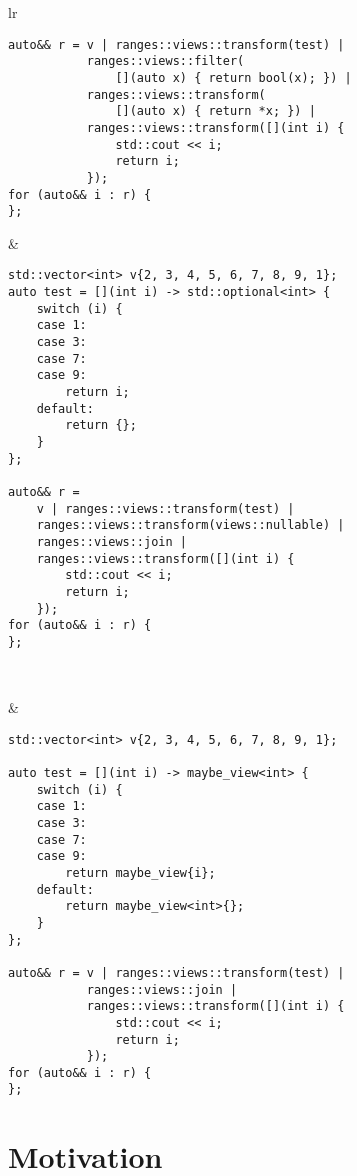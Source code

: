 \documentclass[a4paper,10pt,oneside,openany,final,article]{memoir}
\begin{document}
\begin{tabular}{ lr }
\begin{minipage}[t]{0.45\columnwidth}
\begin{verbatim}
auto&& r = v | ranges::views::transform(test) |
           ranges::views::filter(
               [](auto x) { return bool(x); }) |
           ranges::views::transform(
               [](auto x) { return *x; }) |
           ranges::views::transform([](int i) {
               std::cout << i;
               return i;
           });
for (auto&& i : r) {
};

\end{verbatim}
\end{minipage}
&
\begin{minipage}[t]{0.45\columnwidth}
\begin{verbatim}
std::vector<int> v{2, 3, 4, 5, 6, 7, 8, 9, 1};
auto test = [](int i) -> std::optional<int> {
    switch (i) {
    case 1:
    case 3:
    case 7:
    case 9:
        return i;
    default:
        return {};
    }
};

auto&& r =
    v | ranges::views::transform(test) |
    ranges::views::transform(views::nullable) |
    ranges::views::join |
    ranges::views::transform([](int i) {
        std::cout << i;
        return i;
    });
for (auto&& i : r) {
};

\end{verbatim}
\end{minipage}
  \\ \midrule
\begin{minipage}[t]{0.45\columnwidth}
\end{minipage}
&
\begin{minipage}[t]{0.45\columnwidth}
\begin{verbatim}
std::vector<int> v{2, 3, 4, 5, 6, 7, 8, 9, 1};

auto test = [](int i) -> maybe_view<int> {
    switch (i) {
    case 1:
    case 3:
    case 7:
    case 9:
        return maybe_view{i};
    default:
        return maybe_view<int>{};
    }
};

auto&& r = v | ranges::views::transform(test) |
           ranges::views::join |
           ranges::views::transform([](int i) {
               std::cout << i;
               return i;
           });
for (auto&& i : r) {
};
\end{verbatim}
\end{minipage}

\end{tabular}

\chapter{Motivation}
\end{document}
